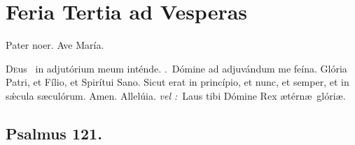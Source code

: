 \documentclass[12pt]{article} %
\newenvironment{response}{\leftskip 0in \setlength{\parindent}{0in}}{\vspace{2 mm}}
\def\vel{\textit{\textcolor{benred8}{vel :}}}
\let\oldRbar\Rbar
\renewcommand{\Rbar}{\textcolor{benred8}{\oldRbar .}}
\let\oldAbar\Abar
\renewcommand{\Abar}{\textcolor{benred8}{\oldAbar .}}
\let\oldgrealtcross\grealtcross
\renewcommand{\grealtcross}{\textcolor{benred8}{\oldgrealtcross}}
\begin{document}
\newpage


\section*{Feria Tertia ad Vesperas}

\begin{center}Pater noer. Ave Mar\'{i}a.\end{center}

\thispagestyle{plain}

\begin{response}\lettrine{D}{e}us \grealtcross\ in adjut\'{o}rium meum int\'{e}nde. \Rbar\ D\'{o}mine ad adjuv\'{a}ndum me fe\'{i}na. Gl\'{o}ria Patri, et F\'{i}lio, et Spir\'{i}tui Sano. Sicut erat in princ\'{i}pio, et nunc, et semper, et in s\'{\ae}cula s\ae cul\'{o}rum. Amen. Allel\'{u}ia. \vel\ Laus tibi D\'{o}mine Rex \ae t\'{e}rn\ae\ gl\'{o}ri\ae .

\end{response}


\subsection*{}



\def\greinitialformat#1{%
{\fontsize{60}{60}\selectfont #1}%
}

\gresetfirstlineaboveinitial{\small \textsc{ \textbf{\textcolor{benred8}{1 \Abar\ IV E}}}}{}%

\def\greinitialformat#1{%
{\fontsize{43}{43}\selectfont #1}%
}

\subsection*{Psalmus 121.}
\end{document}
